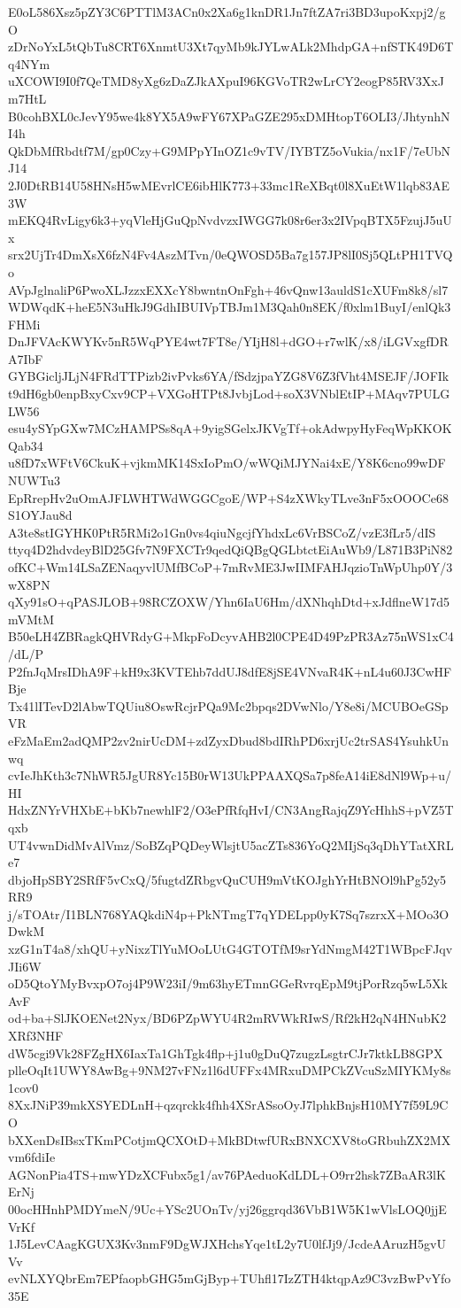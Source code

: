 E0oL586Xsz5pZY3C6PTTlM3ACn0x2Xa6g1knDR1Jn7ftZA7ri3BD3upoKxpj2/gO
zDrNoYxL5tQbTu8CRT6XnmtU3Xt7qyMb9kJYLwALk2MhdpGA+nfSTK49D6Tq4NYm
uXCOWI9I0f7QeTMD8yXg6zDaZJkAXpuI96KGVoTR2wLrCY2eogP85RV3XxJm7HtL
B0cohBXL0cJevY95we4k8YX5A9wFY67XPaGZE295xDMHtopT6OLI3/JhtynhNI4h
QkDbMfRbdtf7M/gp0Czy+G9MPpYInOZ1c9vTV/IYBTZ5oVukia/nx1F/7eUbNJ14
2J0DtRB14U58HNsH5wMEvrlCE6ibHlK773+33mc1ReXBqt0l8XuEtW1lqb83AE3W
mEKQ4RvLigy6k3+yqVleHjGuQpNvdvzxIWGG7k08r6er3x2IVpqBTX5FzujJ5uUx
srx2UjTr4DmXsX6fzN4Fv4AszMTvn/0eQWOSD5Ba7g157JP8lI0Sj5QLtPH1TVQo
AVpJglnaliP6PwoXLJzzxEXXcY8bwntnOnFgh+46vQnw13auldS1cXUFm8k8/sl7
WDWqdK+heE5N3uHkJ9GdhIBUIVpTBJm1M3Qah0n8EK/f0xlm1BuyI/enlQk3FHMi
DnJFVAcKWYKv5nR5WqPYE4wt7FT8e/YIjH8l+dGO+r7wlK/x8/iLGVxgfDRA7IbF
GYBGicljJLjN4FRdTTPizb2ivPvks6YA/fSdzjpaYZG8V6Z3fVht4MSEJF/JOFIk
t9dH6gb0enpBxyCxv9CP+VXGoHTPt8JvbjLod+soX3VNblEtIP+MAqv7PULGLW56
esu4ySYpGXw7MCzHAMPSs8qA+9yigSGelxJKVgTf+okAdwpyHyFeqWpKKOKQab34
u8fD7xWFtV6CkuK+vjkmMK14SxIoPmO/wWQiMJYNai4xE/Y8K6cno99wDFNUWTu3
EpRrepHv2uOmAJFLWHTWdWGGCgoE/WP+S4zXWkyTLve3nF5xOOOCe68S1OYJau8d
A3te8stIGYHK0PtR5RMi2o1Gn0vs4qiuNgcjfYhdxLc6VrBSCoZ/vzE3fLr5/dIS
ttyq4D2hdvdeyBlD25Gfv7N9FXCTr9qedQiQBgQGLbtctEiAuWb9/L871B3PiN82
ofKC+Wm14LSaZENaqyvlUMfBCoP+7mRvME3JwIIMFAHJqzioTnWpUhp0Y/3wX8PN
qXy91sO+qPASJLOB+98RCZOXW/Yhn6IaU6Hm/dXNhqhDtd+xJdflneW17d5mVMtM
B50eLH4ZBRagkQHVRdyG+MkpFoDcyvAHB2l0CPE4D49PzPR3Az75nWS1xC4/dL/P
P2fnJqMrsIDhA9F+kH9x3KVTEhb7ddUJ8dfE8jSE4VNvaR4K+nL4u60J3CwHFBje
Tx41lITevD2lAbwTQUiu8OswRcjrPQa9Mc2bpqs2DVwNlo/Y8e8i/MCUBOeGSpVR
eFzMaEm2adQMP2zv2nirUcDM+zdZyxDbud8bdIRhPD6xrjUc2trSAS4YsuhkUnwq
cvIeJhKth3c7NhWR5JgUR8Yc15B0rW13UkPPAAXQSa7p8feA14iE8dNl9Wp+u/HI
HdxZNYrVHXbE+bKb7newhlF2/O3ePfRfqHvI/CN3AngRajqZ9YcHhhS+pVZ5Tqxb
UT4vwnDidMvAlVmz/SoBZqPQDeyWlsjtU5acZTs836YoQ2MIjSq3qDhYTatXRLe7
dbjoHpSBY2SRfF5vCxQ/5fugtdZRbgvQuCUH9mVtKOJghYrHtBNOl9hPg52y5RR9
j/sTOAtr/I1BLN768YAQkdiN4p+PkNTmgT7qYDELpp0yK7Sq7szrxX+MOo3ODwkM
xzG1nT4a8/xhQU+yNixzTlYuMOoLUtG4GTOTfM9srYdNmgM42T1WBpcFJqvJIi6W
oD5QtoYMyBvxpO7oj4P9W23iI/9m63hyETmnGGeRvrqEpM9tjPorRzq5wL5XkAvF
od+ba+SlJKOENet2Nyx/BD6PZpWYU4R2mRVWkRIwS/Rf2kH2qN4HNubK2XRf3NHF
dW5cgi9Vk28FZgHX6IaxTa1GhTgk4flp+j1u0gDuQ7zugzLsgtrCJr7ktkLB8GPX
plleOqIt1UWY8AwBg+9NM27vFNz1l6dUFFx4MRxuDMPCkZVcuSzMIYKMy8s1cov0
8XxJNiP39mkXSYEDLnH+qzqrckk4fhh4XSrASsoOyJ7lphkBnjsH10MY7f59L9CO
bXXenDsIBsxTKmPCotjmQCXOtD+MkBDtwfURxBNXCXV8toGRbuhZX2MXvm6fdiIe
AGNonPia4TS+mwYDzXCFubx5g1/av76PAeduoKdLDL+O9rr2hsk7ZBaAR3lKErNj
00ocHHnhPMDYmeN/9Uc+YSc2UOnTv/yj26ggrqd36VbB1W5K1wVlsLOQ0jjEVrKf
1J5LevCAagKGUX3Kv3nmF9DgWJXHchsYqe1tL2y7U0lfJj9/JcdeAAruzH5gvUVv
evNLXYQbrEm7EPfaopbGHG5mGjByp+TUhfl17IzZTH4ktqpAz9C3vzBwPvYfo35E

